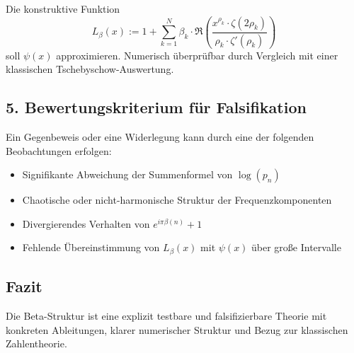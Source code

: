 Die konstruktive Funktion
\[
L_\beta(x) := 1 + \sum_{k=1}^N \beta_k \cdot \Re\left( \frac{x^{\rho_k} \cdot \zeta(2\rho_k)}{\rho_k \cdot \zeta'(\rho_k)} \right)
\]
soll $\psi(x)$ approximieren. Numerisch überprüfbar durch Vergleich mit einer klassischen Tschebyschow-Auswertung.

\subsection*{5. Bewertungskriterium für Falsifikation}

Ein Gegenbeweis oder eine Widerlegung kann durch eine der folgenden Beobachtungen erfolgen:
\begin{itemize}
    \item Signifikante Abweichung der Summenformel von $\log(p_n)$
    \item Chaotische oder nicht-harmonische Struktur der Frequenzkomponenten
    \item Divergierendes Verhalten von $e^{i \pi \beta(n)} + 1$
    \item Fehlende Übereinstimmung von $L_\beta(x)$ mit $\psi(x)$ über große Intervalle
\end{itemize}

\subsection*{Fazit}
Die Beta-Struktur ist eine explizit testbare und falsifizierbare Theorie mit konkreten Ableitungen, klarer numerischer Struktur und Bezug zur klassischen Zahlentheorie.